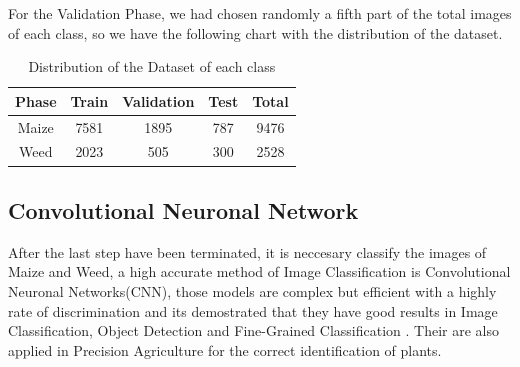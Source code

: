 \documentclass[conference]{IEEEtran}
\begin{document}
For the Validation Phase, we had chosen randomly a fifth part of the total images of each class, so we have the following chart with the distribution of the dataset.

\begin{table}[h!]
\centering
\begin{tabular}{|c | c | c | c | c|} 
 \hline
 Phase & Train & Validation & Test & Total \\ [0.5ex] 
 \hline
 Maize & 7581 & 1895 & 787 & 9476 \\ 
 Weed & 2023 & 505 & 300 & 2528\\[1ex] 
 \hline 
\end{tabular}
\caption{Distribution of the Dataset of each class}
\label{table:1}
\end{table}
	
	
\subsection{Convolutional Neuronal Network}
	After the last step have been terminated, it is neccesary classify the images of Maize and Weed, a high accurate method of Image Classification is Convolutional Neuronal Networks(CNN), those models are complex but efficient with a highly rate of discrimination and its demostrated that they have good results in Image Classification, Object Detection and Fine-Grained  Classification \cite{Razavian}. Their are also applied in Precision Agriculture \cite{Potena:Nardi} for the correct identification of plants.
\\ 
\end{document}
